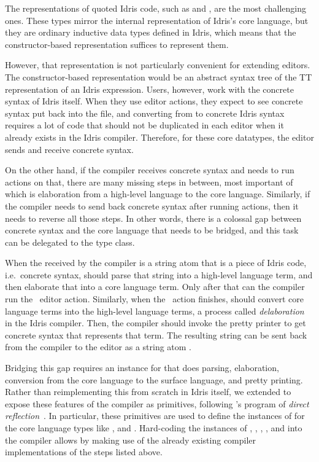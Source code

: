 The \sexp{} representations of quoted Idris code, such as \TT{}  and
\TyDecl{}, are the most challenging ones. These types mirror the internal
representation of Idris's core language, but they are ordinary inductive data
types defined in Idris, which means that the constructor-based representation
suffices to represent them.

However, that representation is not particularly convenient for
extending editors.  The constructor-based representation would be an
abstract syntax tree of the \textsf{TT} representation of an Idris
expression. Users, however, work with the concrete syntax of Idris
itself. When they use editor actions, they expect to see concrete
syntax put back into the file, and converting from \TT{} to concrete
Idris syntax requires a lot of code that should not be duplicated in
each editor when it already exists in the Idris compiler. Therefore,
for these core datatypes, the editor sends and receive concrete
syntax.

On the other hand, if the compiler receives concrete syntax and needs to run \Elab{}
actions on that, there are many missing steps in between, most important of
which is elaboration from a high-level language to the core language.
Similarly, if the compiler needs to send back concrete syntax after
running \Elab{} actions, then it needs to reverse all those steps.
In other words, there is a colossal gap between concrete syntax and the core
language that needs to be bridged, and this task can be delegated to the
\Editorable{} type class.

When the \sexp{} received by the compiler is a string atom that is a
piece of Idris code, i.e.\ concrete syntax,  should parse that
string into a high-level language term, and then elaborate that into a core
language term. Only after that can the compiler run the \Elab\ editor action.
Similarly, when the \Elab\ action finishes,  should convert core
language terms into the high-level language terms, a process called
\emph{delaboration} in the Idris compiler.
Then, the compiler should invoke the pretty printer to get concrete syntax that
represents that term. The resulting string can be sent back from the compiler
to the editor as a string atom \sexp{}.

Bridging this gap requires an \Editorable{} instance for \TT{} that does parsing,
elaboration, conversion from the core language to the surface language, and pretty printing.
Rather than reimplementing this from scratch in Idris itself, we extended \Elab{}
to expose these features of the compiler as primitives, following \citeauthor{barzilayphd}'s program of \emph{direct reflection}~\citep{barzilayphd}.
In particular, these primitives are used to define the instances of \Editorable{}
for the core language types like \TT{}, \TyDecl{} and \FunDefn{}.
Hard-coding the \Editorable{} instances of , ,
, , and  into the compiler
allows  by making use
of the already existing compiler implementations of the steps listed above.


